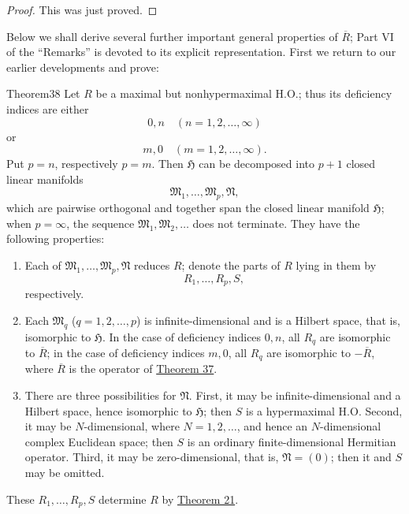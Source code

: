 ﻿\documentclass[paper=b5,fontsize=13pt,bookmarkpackage=false,twoside]{scrartcl}
\newcounter{translatornote}
\begin{document}
\begin{proof}
This was just proved.
\end{proof}

Below we shall derive several further important general properties of $\overline R$; Part VI of the ``Remarks'' is devoted to its explicit representation. First we return to our earlier developments and prove:

\begin{namedstatement}{Theorem}{38}\label{thm:38}
Let $R$ be a maximal but nonhypermaximal H.O.; thus its deficiency indices are either
\[
0,n\quad(n=1,2,\ldots,\infty)
\]
or
\[
m,0\quad(m=1,2,\ldots,\infty).
\]
Put $p=n$, respectively $p=m$. Then $\mathfrak H$ can be decomposed into $p+1$ closed linear manifolds
\[
\mathfrak M_1,\ldots,\mathfrak M_p,\mathfrak N,
\]
which are pairwise orthogonal and together span the closed linear manifold $\mathfrak H$; when $p=\infty$, the sequence $\mathfrak M_1,\mathfrak M_2,\ldots$ does not terminate. They have the following properties:

\begin{enumerate}
\renewcommand{\labelenumi}{$\alpha)$}
\item\label{thm38:alpha}
Each of $\mathfrak M_1,\ldots,\mathfrak M_p,\mathfrak N$ reduces $R$; denote the parts of $R$ lying in them by
\[
R_1,\ldots,R_p,S,
\]
respectively.

\renewcommand{\labelenumi}{$\beta)$}
\item\label{thm38:beta}
Each $\mathfrak M_q$ ($q=1,2,\ldots,p$) is infinite-dimensional and is a Hilbert space, that is, isomorphic to $\mathfrak H$. In the case of deficiency indices $0,n$, all $R_q$ are isomorphic to $\overline R$; in the case of deficiency indices $m,0$, all $R_q$ are isomorphic to $-\overline R$, where $\overline R$ is the operator of \hyperref[thm:37]{Theorem 37}.

\renewcommand{\labelenumi}{$\gamma)$}
\item\label{thm38:gamma}
There are three possibilities for $\mathfrak N$. First, it may be infinite-dimensional and a Hilbert space, hence isomorphic to $\mathfrak H$; then $S$ is a hypermaximal H.O. Second, it may be $N$-dimensional, where $N=1,2,\ldots$, and hence an $N$-dimensional complex Euclidean space; then $S$ is an ordinary finite-dimensional Hermitian operator. Third, it may be zero-dimensional, that is, $\mathfrak N=(0)$; then it and $S$ may be omitted.
\end{enumerate}

These $R_1,\ldots,R_p,S$ determine $R$ by \hyperref[thm:21]{Theorem 21}.
\end{namedstatement}
\end{document}
